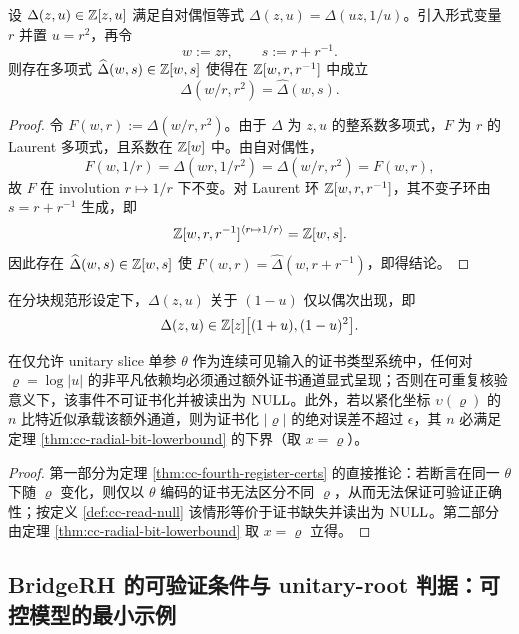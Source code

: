 \begin{proposition}\label{prop:cc-self-dual-ws-invariants}
设 $\Delta(z,u)\in\mathbb{Z}[z,u]$ 满足自对偶恒等式 $\Delta(z,u)=\Delta(uz,1/u)$。引入形式变量 $r$ 并置 $u=r^2$，再令
$$
w:=zr,\qquad s:=r+r^{-1}.
$$
则存在多项式 $\widehat\Delta(w,s)\in\mathbb{Z}[w,s]$ 使得在 $\mathbb{Z}[w,r,r^{-1}]$ 中成立
$$
\Delta(w/r,r^2)=\widehat\Delta(w,s).
$$
\end{proposition}

\begin{proof}
令 $F(w,r):=\Delta(w/r,r^2)$。由于 $\Delta$ 为 $z,u$ 的整系数多项式，$F$ 为 $r$ 的 Laurent 多项式，且系数在 $\mathbb{Z}[w]$ 中。由自对偶性，
$$
F(w,1/r)=\Delta(wr,1/r^2)=\Delta(w/r,r^2)=F(w,r),
$$
故 $F$ 在 involution $r\mapsto 1/r$ 下不变。对 Laurent 环 $\mathbb{Z}[w,r,r^{-1}]$，其不变子环由 $s=r+r^{-1}$ 生成，即
$$
\mathbb{Z}[w,r,r^{-1}]^{\langle r\mapsto 1/r\rangle}=\mathbb{Z}[w,s].
$$
因此存在 $\widehat\Delta(w,s)\in\mathbb{Z}[w,s]$ 使 $F(w,r)=\widehat\Delta(w,r+r^{-1})$，即得结论。
\end{proof}

\begin{assumption}\label{ass:cc-even-radial-coupling}
在分块规范形设定下，$\Delta(z,u)$ 关于 $(1-u)$ 仅以偶次出现，即
$$
\Delta(z,u)\in \mathbb{Z}[z]\bigl[(1+u),(1-u)^2\bigr].
$$
\end{assumption}

\begin{theorem}\label{thm:cc-radial-null}
在仅允许 unitary slice 单参 $\theta$ 作为连续可见输入的证书类型系统中，任何对 $\varrho=\log|u|$ 的非平凡依赖均必须通过额外证书通道显式呈现；否则在可重复核验意义下，该事件不可证书化并被读出为 $\mathrm{NULL}$。此外，若以紧化坐标 $\upsilon(\varrho)$ 的 $n$ 比特近似承载该额外通道，则为证书化 $|\varrho|$ 的绝对误差不超过 $\epsilon$，其 $n$ 必满足定理 \ref{thm:cc-radial-bit-lowerbound} 的下界（取 $x=\varrho$）。
\end{theorem}

\begin{proof}
第一部分为定理 \ref{thm:cc-fourth-register-certs} 的直接推论：若断言在同一 $\theta$ 下随 $\varrho$ 变化，则仅以 $\theta$ 编码的证书无法区分不同 $\varrho$，从而无法保证可验证正确性；按定义 \ref{def:cc-read-null} 该情形等价于证书缺失并读出为 $\mathrm{NULL}$。第二部分由定理 \ref{thm:cc-radial-bit-lowerbound} 取 $x=\varrho$ 立得。
\end{proof}

\subsection{BridgeRH 的可验证条件与 unitary-root 判据：可控模型的最小示例}\label{subsec:cc-bridge}

